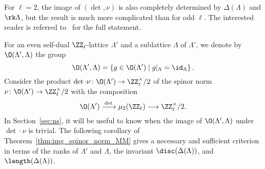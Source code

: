 \begin{remark}\label{rk:img_spinor_even_prime}
For $\ell = 2$, the image of $(\det,\nu)$ is also completely determined by $\Delta(\Lambda)$ and $\rk \Lambda$, but the result is much more complicated than for odd $\ell$. The interested reader is referred to~\cite[Theorems~VII.12.2, VII.12.3, VII.12.4]{MirandaMorrison} for the full statement.
\end{remark}

For an even self-dual $\ZZ_{\ell}$-lattice $\Lambda'$ and a sublattice $\Lambda$ of $\Lambda'$, we denote by $\O(\Lambda',\Lambda)$ the group
\begin{equation}\label{eq:bad_notation}
\O(\Lambda',\Lambda) = \left\{g \in \O(\Lambda')\mid g|_{\Lambda} = \id_{\Lambda} \right\}.
\end{equation}
Consider the product $\det \cdot \nu\colon \O(\Lambda') \rightarrow \ZZ_{\ell}^{\times}/2$ of the spinor norm $\nu \colon \O(\Lambda') \rightarrow \ZZ_{\ell}^{\times}/2$ with the composition
$$
\O(\Lambda') \xrightarrow{\,\det\,} \mu_2(\ZZ_{\ell}) \longrightarrow \ZZ_{\ell}^{\times}/2.
$$
In Section~\ref{sec:ns}, it will be useful to know when the image of $\O(\Lambda',\Lambda)$ under $\det \cdot \nu$ is trivial. The following corollary of Theorem~\ref{thm:img_spinor_norm_MM} gives a necessary and sufficient criterion in terms of the ranks of $\Lambda'$ and $\Lambda$, the invariant $\disc(\Delta(\Lambda))$, and $\length(\Delta(\Lambda))$.

